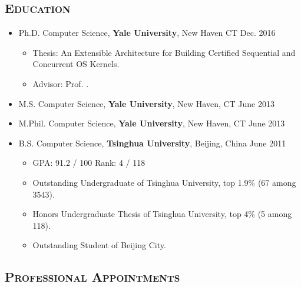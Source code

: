 \documentclass[10pt]{article}
\newcommand{\mhref}[3][black]{\href{#2}{\color{#1}{#3}}}%
\renewcommand{\section}[1]{
	\vspace{-5pt}
   	\subsection*{\scshape  \bfseries #1}
   }
\newenvironment{innerlist}[1][\enskip\textbullet]%
        {\begin{itemize}[#1,leftmargin=25pt,parsep=0pt,itemsep=2pt,topsep=2pt,partopsep=0pt]}
        {\end{itemize}}
\newcommand\yale{\textbf{Yale University}}
\newcommand\tsinghua{\textbf{Tsinghua University}}
\newcommand\zhong{\mhref{http://www.cs.yale.edu/homes/shao/}{Zhong Shao}}
\begin{document}
\section{Education}
\begin{innerlist}
\item[] Ph.D. Computer Science, \yale{}, New Haven CT
\hfill{Dec. 2016}
        \begin{innerlist}
       \item Thesis: An Extensible Architecture for Building Certified Sequential and Concurrent OS Kernels.
       \item Advisor: Prof. \zhong.
        \end{innerlist}

\vspace{0.05in}

\item[] M.S. Computer Science, \yale{}, New Haven, CT
\hfill{June 2013}

\vspace{0.05in}

\item[] M.Phil. Computer Science, \yale{}, New Haven, CT
\hfill{June 2013}

\vspace{0.05in}

\item[] B.S. Computer Science, \tsinghua{}, Beijing, China
\hfill{June 2011}
        \begin{innerlist}
        \item GPA: 91.2 / 100 \qquad Rank: {4 / 118}
        \item Outstanding Undergraduate of Tsinghua University, top 1.9\% (67 among 3543).
        \item Honors Undergraduate Thesis of Tsinghua University, top 4\% (5 among 118).
        \item Outstanding Student of Beijing City.
        \end{innerlist}

\end{innerlist}

\section{Professional Appointments}
\end{document}
